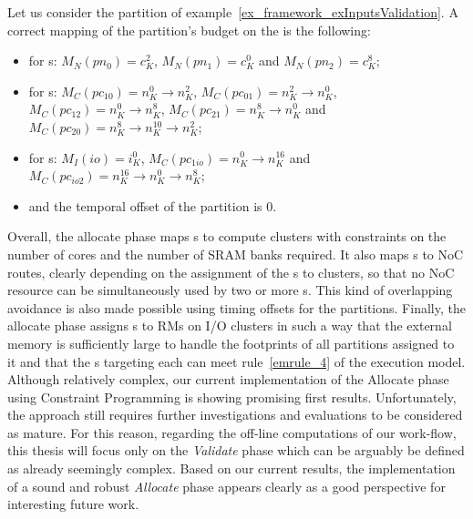 \documentclass[main.tex]{subfiles}
\begin{document}
\begin{description}
        \begin{example}
            Let us consider the partition of example~\ref{ex_framework_exInputsValidation}. A correct mapping of the partition's budget on the \mppalong is the following:
            \begin{itemize}
                \item for \PN{}s: $M_N( pn_0 ) = c_K^2$, $M_N( pn_1 ) = c_K^0$ and $M_N( pn_2 ) = c_K^8$;
                \item for \PC{}s: 
                    $M_C( pc_{10} ) = n_K^0 \to n_K^2$, 
                    $M_C( pc_{01} ) = n_K^2 \to n_K^0$, 
                    $M_C( pc_{12} ) = n_K^0 \to n_K^8$, 
                    $M_C( pc_{21} ) = n_K^8 \to n_K^0$ and
                    $M_C( pc_{20} ) = n_K^8 \to n_K^{10} \to n_K^2$;
                \item for \ION{}s: $M_I(io) = i_K^0$, $M_C( pc_{1io} ) = n_K^0 \to n_K^{16}$ and $M_C( pc_{io2} ) = n_K^{16} \to n_K^0 \to n_K^8$;
                \item and the temporal offset of the partition is 0.
            \end{itemize}
        \end{example}
\end{description}

Overall, the allocate phase maps \PN{}s to compute clusters with constraints on the number of cores and the number of SRAM banks required. It also maps \PC{}s to NoC routes, clearly depending on the assignment of the \PN{}s to clusters, so that no NoC resource can be simultaneously used by two or more \PC{}s. This kind of overlapping avoidance is also made possible using timing offsets for the partitions. Finally, the allocate phase assigns \ION{}s to RMs on I/O clusters in such a way that the external memory is sufficiently large to handle the footprints of all partitions assigned to it and that the \PC{}s targeting each \ION{} can meet rule~\ref{emrule_4} of the execution model.\\


Although relatively complex, our current implementation of the Allocate phase using Constraint Programming is showing promising first results. Unfortunately, the approach still requires further investigations and evaluations to be considered as mature. For this reason, regarding the off-line computations of our work-flow, this thesis will focus only on the \emph{Validate} phase which can be arguably be defined as already seemingly complex. Based on our current results, the implementation of a sound and robust \emph{Allocate} phase appears clearly as a good perspective for interesting future work.
\end{document}
